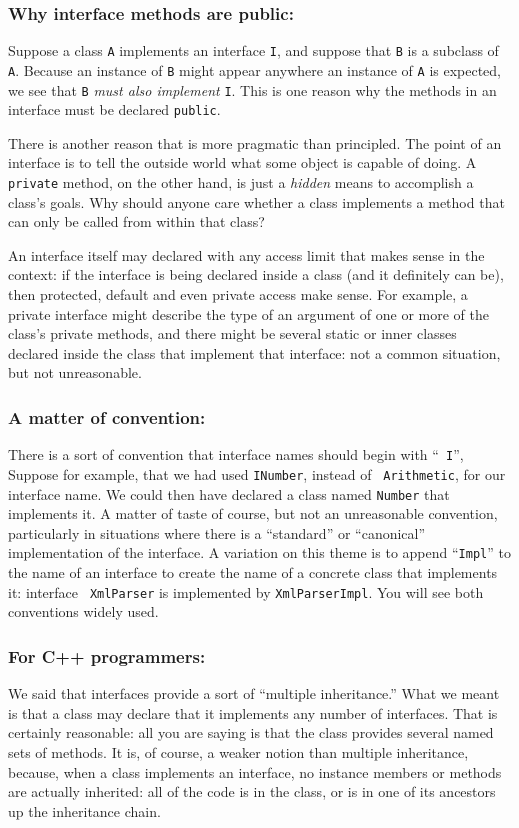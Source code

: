 \subsubsection{ Why interface methods are public:}  Suppose a class {\tt A} implements an
interface {\tt I}, and suppose that {\tt B} is a subclass of {\tt A}.  Because
an instance of {\tt B} might appear anywhere an instance of {\tt A} is 
expected, we see that {\tt B} {\em must also implement} {\tt I}. This is one
reason why the methods in an interface must be declared {\tt public}.

There is another reason that is more pragmatic than principled.  The point of an
interface is to tell the outside world what some object is capable of doing.
A {\tt private} method, on the other hand, is just a {\em hidden} means to
accomplish a class's goals.  Why should anyone care whether a class implements
a method that can only be called from within that class?

An interface itself may declared with any access limit that makes sense in the
context: if the interface is being declared inside a class (and it definitely
can be), then protected, default and even private access make sense.  For
example, a private interface might describe the type of an argument of
one or more of the class's private methods, and there might be several static
or inner classes declared inside the class that implement that interface: not 
a common situation, but not unreasonable.

\subsubsection{ A matter of convention: }
There is a sort of convention that interface names should begin with ``{\tt
I}'',  Suppose for example, that we had used {\tt INumber}, instead of {\tt
Arithmetic}, for our interface name.  We could then have declared  a class
named {\tt Number} that implements it.  A matter of taste of course, but not an
unreasonable convention, particularly in situations where there is a
``standard'' or ``canonical'' implementation of the interface.  A variation on
this theme is to append ``{\tt Impl}'' to the name of an interface to create
the name of a concrete class that implements it: \eg{} interface {\tt
XmlParser} is implemented by {\tt XmlParserImpl}.  You will see both
conventions widely used.

\subsubsection{ For C++ programmers: } 
We said that interfaces provide a sort of
``multiple inheritance.''  What we meant is that a class may declare that it
implements any number of interfaces.  That is certainly reasonable: all you are
saying is that the class provides several named sets of methods.  It is, of
course, a weaker notion than multiple inheritance, because,  when a class
implements an interface, no instance members or methods are actually inherited:
all of the code is in the class, or is in one of its ancestors up the
inheritance chain.

